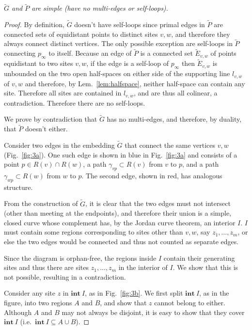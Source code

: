 \documentclass[11pt]{article}
\begin{document}
\emph{
$\tilde{G}$ and $\tilde{P}$ are simple (have no multi-edges or self-loops).
}
\begin{proof}



By definition, $\tilde{G}$ doesn't have self-loops since primal edges in $\tilde{P}$ are connected sets of equidistant points to distinct sites $v,w$, and
therefore they always connect distinct vertices. 
The only possible exception are self-loops in $\tilde{P}$ connecting
$p_\infty$ to itself. 
Because an edge of $\tilde{P}$ is a connected set $\tilde{E}_{v,w}$ of points
equidistant to two sites $v,w$, if the edge is a self-loop of $p_\infty$
then $\tilde{E}_{v,w}$ is unbounded on the two open half-spaces on either side of the
supporting line $l_{v,w}$ of $v,w$ and therefore, by Lem.~\ref{lem:halfspace},
neither half-space can contain any site. Therefore all sites are contained
in $l_{v,w}$, and are thus all colinear, a contradiction. Therefore there are no
self-loops. 

We prove by contradiction that $\tilde{G}$ has no multi-edges, 
and therefore, by duality, that $\tilde{P}$ doesn't either. 

Consider two edges in the embedding $\tilde{G}$ that connect the same vertices $v,w$
(Fig.~\ref{fig:3a}).
One such edge is shown in blue in Fig.~\ref{fig:3a} and consists of a point $p\in R(v)\cap R(w)$, 
a path $\gamma_{vp}\subset R(v)$ from $v$ to $p$, 
and a path $\gamma_{wp}\subset R(w)$ from $w$ to $p$.
The second edge, shown in red, has analogous structure. 

From the construction of $\tilde{G}$, it is clear that the two edges must not intersect (other
than meeting at the endpoints), and therefore their union is a simple, closed
curve whose complement has, by the Jordan curve theorem, an interior $I$. 
$I$ must contain some regions corresponding to sites other than $v,w$, say $z_1,\dots,z_m$, 
or else the two edges would be connected and thus not counted as separate edges. 

Since the diagram is orphan-free, the regions inside $I$ contain their
generating sites and thus there are sites $z_1,\dots,z_m$ in the
interior of $I$. 
We show that this is not possible, resulting in a contradiction. 


Consider any site $z$ in $\mathbf{int\ }{I}$, as in Fig.~\ref{fig:3b}. 
We first split $\mathbf{int\ }{I}$, as in the figure, into two regions $A$ and
$B$, and show that $z$ cannot belong to either. 
Although $A$ and $B$ may not always be disjoint, it is easy to show that
they cover $\mathbf{int\ }{I}$ (i.e.\  $\mathbf{int\ }{I}\subseteq A\cup B$).


\end{proof}
\end{document}
